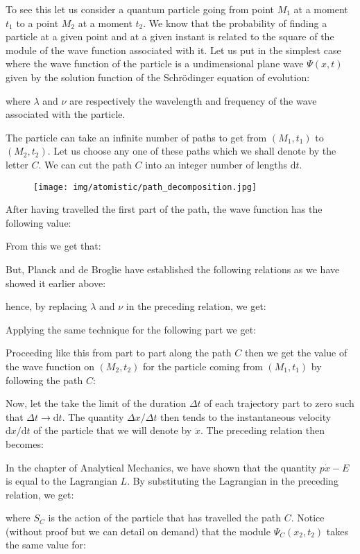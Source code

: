 	To see this let us consider a quantum particle going from point $M_1$ at a moment $t_1$ to a point $M_2$ at a moment $t_2$. We know that the probability of finding a particle at a given point and at a given instant is related to the square of the module of the wave function associated with it. Let us put in the simplest case where the wave function of the particle is a undimensional plane wave $\Psi(x,t)$ given by the solution function of the Schrödinger equation of evolution:
	
	where $\lambda$ and $\nu$ are respectively the wavelength and frequency of the wave associated with the particle.

	The particle can take an infinite number of paths to get from $(M_1,t_1)$ to $(M_2,t_2)$. Let us choose any one of these paths which we shall denote by the letter $C$. We can cut the path $C$ into an integer number of lengths $\mathrm{d}t$.
	\begin{figure}[H]
		\centering
		\texttt{[image: img/atomistic/path\_decomposition.jpg]}	
	\end{figure}
	After having travelled the first part of the path, the wave function has the following value:
	
	From this we get that:
	
	But, Planck and de Broglie have established the following relations as we have showed it earlier above:
	
	hence, by replacing $\lambda$ and $\nu$ in the preceding relation, we get:
	
	Applying the same technique for the following part we get:
	
	Proceeding like this from part to part along the path $C$ then we get the value of the wave function on $(M_2,t_2)$ for the particle coming from $(M_1,t_1)$ by following the path $C$:
	
	Now, let the take the limit of the duration $\Delta t$ of each trajectory part to zero such that $\Delta t\rightarrow \mathrm{d}t$. The quantity $\Delta x/\Delta t$ then tends to the instantaneous velocity $\mathrm{d}x/\mathrm{d}t$ of the particle that we will denote by $\dot{x}$. The preceding relation then becomes:
	
	In the chapter of Analytical Mechanics, we have shown that the quantity $p\dot{x}-E$ is equal to the Lagrangian $L$. By substituting the Lagrangian in the preceding relation, we get:
	
	where $S_C$ is the action of the particle that has travelled the path $C$.
	Notice (without proof but we can detail on demand) that the module $\Psi_C(x_2,t_2)$ takes the same value for:
	
